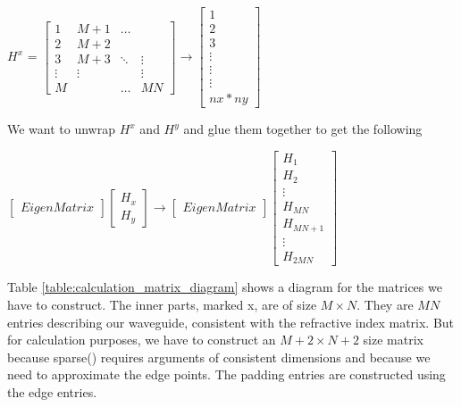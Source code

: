 \documentclass[letter]{article}
\begin{document}
			\begin{center}
			$H^x$ = 
			$\begin{bmatrix}
				1 & M+1 &  \hdots &  \\
				2 & M+2 &    &    \\
				3 & M+3 &  \ddots &   \vdots \\
				\vdots & \vdots &    & \vdots \\
				M &  & \hdots   & MN 
			\end{bmatrix}  
			\rightarrow
			\begin{bmatrix}
			1 \\ 2 \\ 3 \\ \vdots \\ \vdots \\ \vdots \\ nx*ny 
			\end{bmatrix}  $\\
			
		\end{center}
		
		We want to unwrap $H^x$ and $H^y$ and glue them together to get the following
		\begin{center}$
			\begin{bmatrix}
				EigenMatrix
			\end{bmatrix}
			\begin{bmatrix}
				H_x \\ H_y
			\end{bmatrix}
			\rightarrow
			\begin{bmatrix}
				EigenMatrix
			\end{bmatrix}
			\begin{bmatrix}
				H_1 \\ H_2 \\ \vdots \\ H_{MN} \\ H_{MN+1} \\ \vdots \\ H_{2MN}
			\end{bmatrix}
		$\end{center}
		 		 
		 Table \ref{table:calculation_matrix_diagram} shows a diagram for the matrices we have to construct. The inner parts, marked x, are of size $M \times N$. They are $MN$ entries describing our waveguide, consistent with the refractive index matrix. But for calculation purposes, we have to construct an $M+2 \times N+2$ size matrix because sparse() requires arguments of consistent dimensions and because we need to approximate the edge points. The padding entries are constructed using the edge entries. 
		 
\end{document}
